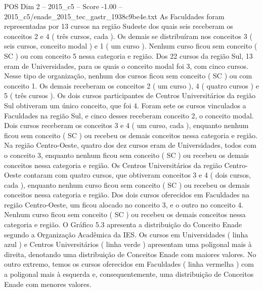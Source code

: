 \begin{textsample}{POS Dim 2 – 2015\_c5 – Score -1.00 – 2015\_c5/enade\_2015\_tec\_gastr\_1938c9be4e.txt}
As Faculdades foram representadas por 13 cursos na região Sudeste dos quais seis receberam os conceitos 2 e 4 ( três cursos, cada ).
Os demais se distribuíram nos conceitos 3 ( seis cursos, conceito modal ) e 1 ( um curso ).
Nenhum curso ficou sem conceito ( SC ) ou com conceito 5 nessa categoria e região.
Dos 22 cursos da região Sul, 13 eram de Universidades, para os quais o conceito modal foi 3, com cinco cursos.
Nesse tipo de organização, nenhum dos cursos ficou sem conceito ( SC ) ou com conceito 1.
Os demais receberam os conceitos 2 ( um curso ), 4 ( quatro cursos ) e 5 ( três cursos ).
Os dois cursos participantes de Centros Universitários da região Sul obtiveram um único conceito, que foi 4.
Foram sete os cursos vinculados a Faculdades na região Sul, e cinco desses receberam conceito 2, o conceito modal.
Dois cursos receberam os conceitos 3 e 4 ( um curso, cada ), enquanto nenhum ficou sem conceito ( SC ) ou recebeu os demais conceitos nessa categoria e região.
Na região Centro-Oeste, quatro dos dez cursos eram de Universidades, todos com o conceito 3, enquanto nenhum ficou sem conceito ( SC ) ou recebeu os demais conceitos nessa categoria e região.
Os Centros Universitários da região Centro-Oeste contaram com quatro cursos, que obtiveram conceitos 3 e 4 ( dois cursos, cada ), enquanto nenhum curso ficou sem conceito ( SC ) ou recebeu os demais conceitos nessa categoria e região.
Dos dois cursos oferecidos em Faculdades na região Centro-Oeste, um ficou alocado no conceito 3, e o outro no conceito 4.
Nenhum curso ficou sem conceito ( SC ) ou recebeu os demais conceitos nessa categoria e região.
O Gráfico 5.3 apresenta a distribuição do Conceito Enade segundo a Organização Acadêmica da IES.
Os cursos em Universidades ( linha azul ) e Centros Universitários ( linha verde ) apresentam uma poligonal mais à direita, denotando uma distribuição de Conceitos Enade com maiores valores.
No outro extremo, temos os cursos oferecidos em Faculdades ( linha vermelha ) com a poligonal mais à esquerda e, consequentemente, uma distribuição de Conceitos Enade com menores valores.

\end{textsample}
